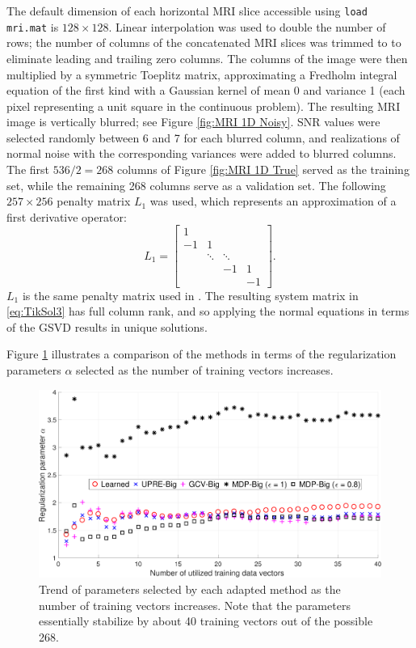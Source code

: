 \documentclass[12pt]{article}
\newcommand{\regparam}{\alpha}  %
\begin{document}
\noindent The default dimension of each horizontal MRI slice accessible using \texttt{load mri.mat} is $128 \times 128$. Linear interpolation was used to double the number of rows; the number of columns of the concatenated MRI slices was trimmed to to eliminate leading and trailing zero columns. The columns of the image were then multiplied by a symmetric Toeplitz matrix, approximating a Fredholm integral equation of the first kind with a Gaussian kernel of mean 0 and variance 1 (each pixel representing a unit square in the continuous problem). The resulting MRI image is vertically blurred; see Figure \ref{fig:MRI 1D Noisy}. SNR values were selected randomly between 6 and 7 for each blurred column, and realizations of normal noise with the corresponding variances were added to blurred columns. The first $536/2 = 268$ columns of Figure \ref{fig:MRI 1D True} served as the training set, while the remaining 268 columns serve as a validation set.  The following $257 \times 256$ penalty matrix $L_1$ was used, which represents an approximation of a first derivative operator:
\[L_1 = \begin{bmatrix}
1 & & & \\
-1 & 1 & &  \\
 & \ddots &  \ddots & \\
 & & -1 & 1 \\
 & & & -1
\end{bmatrix}.\]
$L_1$ is the same penalty matrix used in \cite{ChungEspanol2017}. The resulting system matrix in \eqref{eq:TikSol3} has full column rank, and so applying the normal equations in terms of the GSVD results in unique solutions. \par 
Figure \ref{fig:Parameters 1D MRI} illustrates a comparison of the methods in terms of the regularization parameters $\regparam$ selected as the number of training vectors increases. 

\begin{figure}[ht]
\includegraphics[scale=0.36]{Figures/Parameters1D_mri}
\caption{Trend of parameters selected by each adapted method as the number of training vectors increases. Note that the parameters essentially stabilize by about 40 training vectors out of the possible 268.}
\label{fig:Parameters 1D MRI}
\end{figure}
\end{document}
